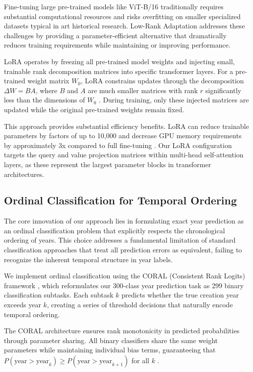 \documentclass[10pt,twocolumn,letterpaper]{article}
\begin{document}
Fine-tuning large pre-trained models like ViT-B/16 traditionally requires substantial computational resources and risks overfitting on smaller specialized datasets typical in art historical research. Low-Rank Adaptation \cite{Hu21LoRA} addresses these challenges by providing a parameter-efficient alternative that dramatically reduces training requirements while maintaining or improving performance.

LoRA operates by freezing all pre-trained model weights and injecting small, trainable rank decomposition matrices into specific transformer layers. For a pre-trained weight matrix $W_0$, LoRA constrains updates through the decomposition $\Delta W = BA$, where $B$ and $A$ are much smaller matrices with rank $r$ significantly less than the dimensions of $W_0$ \cite{Hu21LoRA}. During training, only these injected matrices are updated while the original pre-trained weights remain fixed.

This approach provides substantial efficiency benefits. LoRA can reduce trainable parameters by factors of up to 10,000 and decrease GPU memory requirements by approximately 3x compared to full fine-tuning \cite{Hu21LoRA}. Our LoRA configuration targets the query and value projection matrices within multi-head self-attention layers, as these represent the largest parameter blocks in transformer architectures.

\subsection{Ordinal Classification for Temporal Ordering}

The core innovation of our approach lies in formulating exact year prediction as an ordinal classification problem that explicitly respects the chronological ordering of years. This choice addresses a fundamental limitation of standard classification approaches that treat all prediction errors as equivalent, failing to recognize the inherent temporal structure in year labels.

We implement ordinal classification using the CORAL (Consistent Rank Logits) framework \cite{Cao20Ordinal}, which reformulates our 300-class year prediction task as 299 binary classification subtasks. Each subtask $k$ predicts whether the true creation year exceeds year $k$, creating a series of threshold decisions that naturally encode temporal ordering.

The CORAL architecture ensures rank monotonicity in predicted probabilities through parameter sharing. All binary classifiers share the same weight parameters while maintaining individual bias terms, guaranteeing that $P(\text{year} > \text{year}_k) \geq P(\text{year} > \text{year}_{k+1})$ for all $k$ \cite{Cao20Ordinal}.
\end{document}
